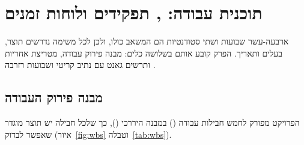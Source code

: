 \chapter{תוכנית עבודה: , תפקידים ולוחות זמנים}
\label{ch:plan}

\begin{managerbox}
ארבעה-עשר שבועות ושתי סטודנטיות הם המשאב כולו, ולכן לכל משימה נדרשים תוצר, בעלים ותאריך. הפרק קובע אותם בשלושה כלים: מבנה פירוק עבודה, מטריצת אחריות ותרשים גאנט עם נתיב קריטי ושבועות רזרבה \cite{pmi2021pmbok,kerzner2017pm}.
\end{managerbox}

\section{מבנה פירוק העבודה}
\label{sec:wbs}

הפרויקט מפורק לחמש חבילות עבודה () במבנה היררכי (), כך שלכל חבילה יש תוצר מוגדר שאפשר לבדוק (איור~\ref{fig:wbs} וטבלה~\ref{tab:wbs}).

